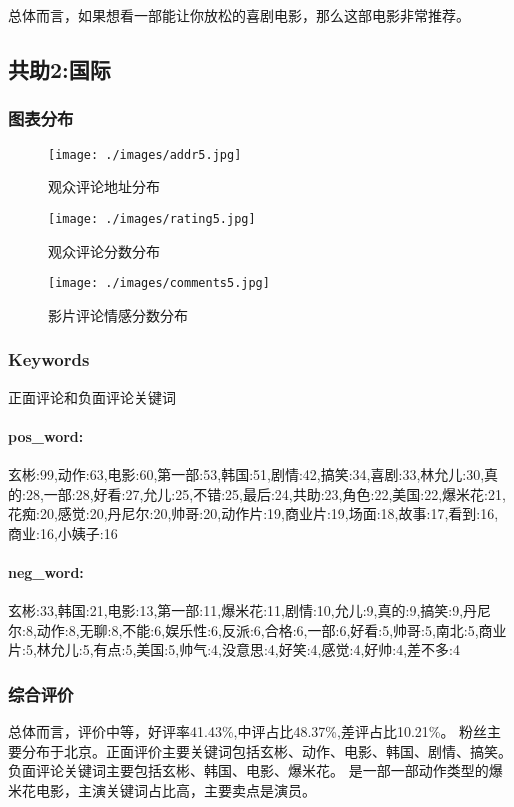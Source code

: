 \documentclass[12pt]{article}
\begin{document}
总体而言，如果想看一部能让你放松的喜剧电影，那么这部电影非常推荐。

\subsection*{共助2:国际}
\subsubsection*{图表分布}
\begin{figure}[H]
    \centering
    \begin{minipage}[t]{0.48\textwidth}
    \centering
    \texttt{[image: ./images/addr5.jpg]}
    \caption{观众评论地址分布}
    \end{minipage}
    \begin{minipage}[t]{0.48\textwidth}
    \centering
    \texttt{[image: ./images/rating5.jpg]}
    \caption{观众评论分数分布}
    \end{minipage}
\end{figure}
\begin{figure}[H]
    \centering
    \texttt{[image: ./images/comments5.jpg]}
    \caption{影片评论情感分数分布} 
\end{figure}
\subsubsection*{Keywords}
正面评论和负面评论关键词
\paragraph*{pos\_word:}
玄彬:99,动作:63,电影:60,第一部:53,韩国:51,剧情:42,搞笑:34,喜剧:33,林允儿:30,真的:28,一部:28,好看:27,允儿:25,不错:25,最后:24,共助:23,角色:22,美国:22,爆米花:21,花痴:20,感觉:20,丹尼尔:20,帅哥:20,动作片:19,商业片:19,场面:18,故事:17,看到:16,商业:16,小姨子:16
\paragraph*{neg\_word:}
玄彬:33,韩国:21,电影:13,第一部:11,爆米花:11,剧情:10,允儿:9,真的:9,搞笑:9,丹尼尔:8,动作:8,无聊:8,不能:6,娱乐性:6,反派:6,合格:6,一部:6,好看:5,帅哥:5,南北:5,商业片:5,林允儿:5,有点:5,美国:5,帅气:4,没意思:4,好笑:4,感觉:4,好帅:4,差不多:4
\subsubsection*{综合评价}
总体而言，评价中等，好评率41.43\%,中评占比48.37\%,差评占比10.21\%。
粉丝主要分布于北京。正面评价主要关键词包括玄彬、动作、电影、韩国、剧情、搞笑。
负面评论关键词主要包括玄彬、韩国、电影、爆米花。
是一部一部动作类型的爆米花电影，主演关键词占比高，主要卖点是演员。
\end{document}
